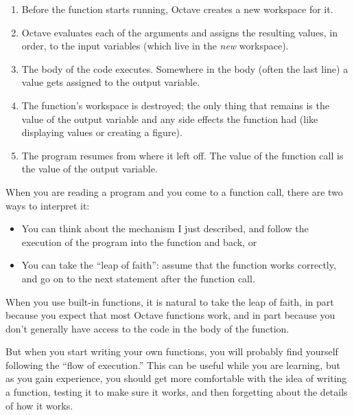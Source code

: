 \documentclass{book}
\begin{document}
\begin{enumerate}

\item Before the function starts running, Octave creates a new
workspace for it.

\item Octave evaluates each of the arguments and assigns
the resulting values, in order, to the input variables (which
live in the {\em new} workspace).

\item The body of the code executes. Somewhere in the body
(often the last line) a value gets assigned to the output variable.

\item The function's workspace is destroyed; the only thing
that remains is the value of the output variable and any side
effects the function had (like displaying values or creating
a figure).

\item The program resumes from where it left off. The value
of the function call is the value of the output variable.

\end{enumerate}

When you are reading a program and you come to a function call,
there are two ways to interpret it:

\begin{itemize}

\item You can think about the mechanism I just described,
and follow the execution of the program into the function and back, or

\item You can take the ``leap of faith'': assume that the function
works correctly, and go on to the next statement after the
function call.

\end{itemize}

When you use built-in functions, it is natural to take the leap
of faith, in part because you expect that most
Octave functions work, and in part because you don't
generally have access to the code in the body of the function.

But when you start writing your own functions, you will probably
find yourself following the ``flow of execution.'' This can
be useful while you are learning, but as you gain experience, you
should get more comfortable with the idea of writing a function,
testing it to make sure it works, and then forgetting about the
details of how it works.
\end{document}

